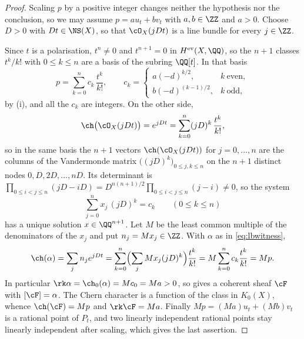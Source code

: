 \begin{proof}
Scaling $p$ by a positive integer changes neither the hypothesis nor the
conclusion, so we may assume $p=au_{t}+bv_{t}$ with $a,b\in\ZZ$ and $a>0$.
Choose $D>0$ with $Dt\in\NS(X)$, so that $\cO_{X}(jDt)$ is a line bundle for
every $j\in\ZZ$.

Since $t$ is a polarisation, $t^{n}\ne0$ and $t^{n+1}=0$ in
$H^{\mathrm{ev}}(X,\QQ)$, so the $n+1$ classes $t^{k}/k!$ with $0\le k\le n$
are a basis of the subring $\QQ[t]$. In that basis
\[
  p=\sum_{k=0}^{n}c_{k}\,\frac{t^{k}}{k!},\qquad
  c_{k}=\begin{cases}a(-d)^{k/2}, & k\ \text{even},\\[2pt]
                     b(-d)^{(k-1)/2}, & k\ \text{odd},\end{cases}
\]
by (i), and all the $c_{k}$ are integers. On the other
side,
\[
  \ch\bigl(\cO_{X}(jDt)\bigr)=e^{jDt}=\sum_{k=0}^{n}(jD)^{k}\,\frac{t^{k}}{k!},
\]
so in the same basis the $n+1$ vectors $\ch(\cO_{X}(jDt))$ for $j=0,\dots,n$
are the columns of the Vandermonde matrix $\bigl((jD)^{k}\bigr)_{0\le j,k\le n}$
on the $n+1$ distinct nodes $0,D,2D,\dots,nD$. Its determinant is
$\prod_{0\le i<j\le n}(jD-iD)=D^{n(n+1)/2}\prod_{0\le i<j\le n}(j-i)\ne0$, so
the system
\[
  \sum_{j=0}^{n}x_{j}\,(jD)^{k}=c_{k}\qquad(0\le k\le n)
\]
has a unique solution $x\in\QQ^{n+1}$. Let $M$ be the least common multiple of
the denominators of the $x_{j}$ and put $n_{j}=Mx_{j}\in\ZZ$. With $\alpha$ as
in \eqref{eq:lbwitness},
\[
  \ch(\alpha)=\sum_{j}n_{j}e^{jDt}
  =\sum_{k=0}^{n}\Bigl(\sum_{j}Mx_{j}(jD)^{k}\Bigr)\frac{t^{k}}{k!}
  =M\sum_{k=0}^{n}c_{k}\frac{t^{k}}{k!}=Mp .
\]
In particular $\rk\alpha=\ch_{0}(\alpha)=Mc_{0}=Ma>0$, so 
gives a coherent sheaf $\cF$ with $[\cF]=\alpha$. The Chern character is a
function of the class in $K_{0}(X)$, whence $\ch(\cF)=Mp$ and $\rk\cF=Ma$.
Finally $Mp=(Ma)u_{t}+(Mb)v_{t}$ is a rational point of $P_{t}$, and two
linearly independent rational points stay linearly independent after scaling,
which gives the last assertion.
\end{proof}

